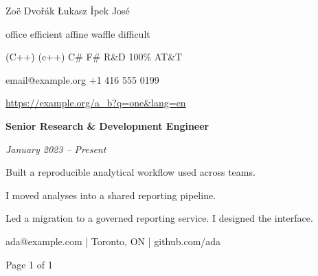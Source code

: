 \documentclass[11pt]{article}
\begin{document}
Zoë Dvořák Łukasz İpek José

office efficient affine waffle difficult

(C++) (c++) C\# F\# R\&D 100\% AT\&T

email@example.org +1 416 555 0199

\href{https://example.org/a_b?q=one&lang=en}{https://example.org/a\_b?q=one\&lang=en}

\textbf{Senior Research \& Development Engineer}

\textit{January 2023 -- Present}

%
%
%
%
%
Built a reproducible analytical workflow used across teams.

I moved analyses into a shared reporting pipeline.

Led a migration to a governed reporting service. I designed the interface.

ada@example.com | Toronto, ON | github.com/ada

Page 1 of 1
\end{document}
